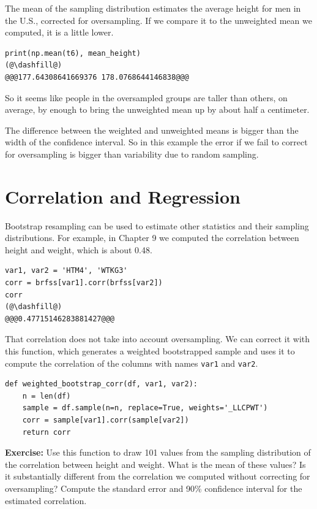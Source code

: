 The mean of the sampling distribution estimates the average height for
men in the U.S., corrected for oversampling. If we compare it to the
unweighted mean we computed, it is a little lower.

\begin{lstlisting}[]
print(np.mean(t6), mean_height)
(@\dashfill@)
@@@177.64308641669376 178.0768644146838@@@
\end{lstlisting}

So it seems like people in the oversampled groups are taller than
others, on average, by enough to bring the unweighted mean up by about
half a centimeter.

The difference between the weighted and unweighted means is bigger than
the width of the confidence interval. So in this example the error if we
fail to correct for oversampling is bigger than variability due to
random sampling.

\hypertarget{correlation-and-regression}{%
\section{Correlation and Regression}\label{correlation-and-regression}}

Bootstrap resampling can be used to estimate other statistics and their
sampling distributions. For example, in Chapter 9 we computed the
correlation between height and weight, which is about 0.48.

\begin{lstlisting}[]
var1, var2 = 'HTM4', 'WTKG3'
corr = brfss[var1].corr(brfss[var2])
corr
(@\dashfill@)
@@@0.47715146283881427@@@
\end{lstlisting}

That correlation does not take into account oversampling. We can correct
it with this function, which generates a weighted bootstrapped sample
and uses it to compute the correlation of the columns with names
\passthrough{\lstinline!var1!} and \passthrough{\lstinline!var2!}.

\begin{lstlisting}[]
def weighted_bootstrap_corr(df, var1, var2):
    n = len(df)
    sample = df.sample(n=n, replace=True, weights='_LLCPWT')
    corr = sample[var1].corr(sample[var2])
    return corr
\end{lstlisting}

\textbf{Exercise:} Use this function to draw 101 values from the
sampling distribution of the correlation between height and weight. What
is the mean of these values? Is it substantially different from the
correlation we computed without correcting for oversampling? Compute the
standard error and 90\% confidence interval for the estimated
correlation.


